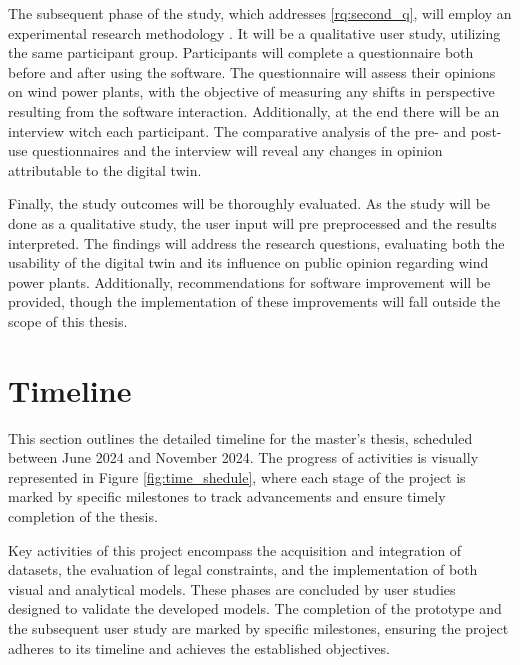 \documentclass[11pt, titlepage, a4paper]{scrartcl}
\begin{document}
\begin{linenumbers}
The subsequent phase of the study, which addresses \cref{rq:second_q}, will employ an experimental research methodology \cite{lazarResearchMethodsHuman2017}. It will be a qualitative user study, utilizing the same participant group. Participants will complete a questionnaire both before and after using the software. The questionnaire will assess their opinions on wind power plants, with the objective of measuring any shifts in perspective resulting from the software interaction. Additionally, at the end there will be an interview witch each participant. The comparative analysis of the pre- and post-use questionnaires and the interview will reveal any changes in opinion attributable to the digital twin.

Finally, the study outcomes will be thoroughly evaluated. As the study will be done as a qualitative study, the user input will pre preprocessed and the results interpreted. The findings will address the research questions, evaluating both the usability of the digital twin and its influence on public opinion regarding wind power plants. Additionally, recommendations for software improvement will be provided, though the implementation of these improvements will fall outside the scope of this thesis.


\section{Timeline}
This section outlines the detailed timeline for the master's thesis, scheduled between June 2024 and November 2024.
The progress of activities is visually represented in Figure \ref{fig:time_shedule}, where each stage of the project is marked by specific milestones to track advancements and ensure timely completion of the thesis.


Key activities of this project encompass the acquisition and integration of datasets, the evaluation of legal constraints, and the implementation of both visual and analytical models. These phases are concluded by user studies designed to validate the developed models. The completion of the prototype and the subsequent user study are marked by specific milestones, ensuring the project adheres to its timeline and achieves the established objectives.


\end{linenumbers}
\end{document}
